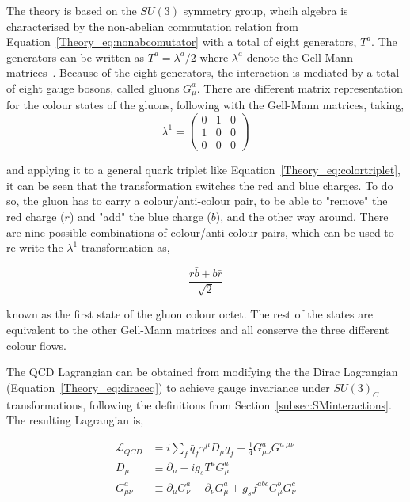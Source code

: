 The theory is based on the $SU(3)$ symmetry group, whcih algebra is characterised by the non-abelian commutation relation from Equation~\ref{Theory_eq:nonabcomutator}
with a total of eight generators, $T^a$. The generators can be written as $T^a=\lambda^a/2$ where $\lambda^a$
denote the Gell-Mann matrices~\cite{GellMann}.
Because of the eight generators, the interaction is mediated by a total of eight gauge bosons, called gluons $G_\mu^a$.
There are different matrix representation for the colour states of the gluons, following with the Gell-Mann matrices, taking,
\begin{equation}
\lambda^1 = \begin{pmatrix} 0 & 1 & 0 \\
1 & 0 & 0 \\
0 & 0 & 0 \end{pmatrix}
\end{equation}

and applying it to a general quark triplet like Equation~\ref{Theory_eq:colortriplet},
it can be seen that the transformation switches the red and blue charges.
To do so, the gluon has to carry a colour/anti-colour pair, to be able to "remove" the red charge ($r$) and "add" the blue charge ($b$),
and the other way around. There are nine possible combinations of colour/anti-colour pairs, which can be used to re-write the $\lambda^1$
transformation as,

\begin{equation}
\frac{r\bar{b}+b\bar{r}}{\sqrt{2}}
\end{equation}

known as the first state of the gluon colour octet. The rest of the states are equivalent to the other Gell-Mann matrices and all conserve
the three different colour flows.

The QCD Lagrangian can be obtained from modifying the the Dirac Lagrangian (Equation~\ref{Theory_eq:diraceq})
to achieve gauge invariance under $SU(3)_C$ transformations, following the definitions from Section~\ref{subsec:SMinteractions}.
The resulting Lagrangian is,

\begin{equation}
\label{Theory_eq:diraceq30}
\begin{split}
    \mathcal{L}_{QCD} &= i\sum_f \bar{q}_f\gamma^\mu D_\mu q_f - \frac{1}{4}G_{\mu\nu}^aG^{a\ \mu\nu} \\
    D_{\mu \ } &\equiv \partial_\mu -ig_sT^aG^a_\mu \\
    G_{\mu\nu}^a &\equiv \partial_\mu G_\nu^a - \partial_\nu G_\mu^a + g_s f^{abc}G_\mu^b G_\nu^c
\end{split}
\end{equation}

